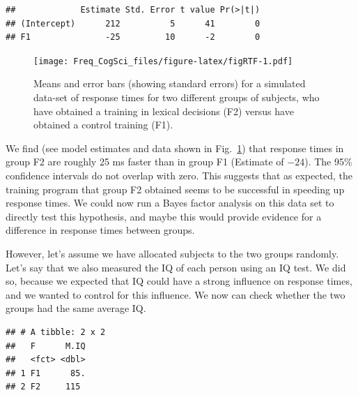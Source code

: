 \documentclass[12pt,]{krantz}
\newenvironment{Shaded}{\begin{snugshade}}{\end{snugshade}}
\newcommand{\DataTypeTok}[1]{\textcolor[rgb]{0.13,0.29,0.53}{#1}}
\newcommand{\KeywordTok}[1]{\textcolor[rgb]{0.13,0.29,0.53}{\textbf{#1}}}
\newcommand{\NormalTok}[1]{#1}
\newcommand{\OperatorTok}[1]{\textcolor[rgb]{0.81,0.36,0.00}{\textbf{#1}}}
\newcommand{\StringTok}[1]{\textcolor[rgb]{0.31,0.60,0.02}{#1}}
\begin{document}
\begin{verbatim}
##             Estimate Std. Error t value Pr(>|t|)
## (Intercept)      212          5      41        0
## F1               -25         10      -2        0
\end{verbatim}

\begin{figure}
\centering
\texttt{[image: Freq\_CogSci\_files/figure-latex/figRTF-1.pdf]}
\caption{\label{fig:figRTF}Means and error bars (showing standard errors) for a simulated data-set of response times for two different groups of subjects, who have obtained a training in lexical decisions (F2) versus have obtained a control training (F1).}
\end{figure}

We find (see model estimates and data shown in Fig.~\ref{fig:figRTF}) that response times in group F2 are roughly 25 ms faster than in group F1 (Estimate of \(-24\)). The 95\% confidence intervals do not overlap with zero. This suggests that as expected, the training program that group F2 obtained seems to be successful in speeding up response times. We could now run a Bayes factor analysis on this data set to directly test this hypothesis, and maybe this would provide evidence for a difference in response times between groups.

However, let's assume we have allocated subjects to the two groups randomly. Let's say that we also measured the IQ of each person using an IQ test. We did so, because we expected that IQ could have a strong influence on response times, and we wanted to control for this influence. We now can check whether the two groups had the same average IQ.

\begin{Shaded}
\end{Shaded}

\begin{verbatim}
## # A tibble: 2 x 2
##   F      M.IQ
##   <fct> <dbl>
## 1 F1      85.
## 2 F2     115
\end{verbatim}
\end{document}
